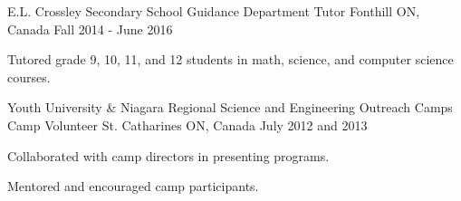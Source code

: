 
\begin{cventries}

\cventry
    {E.L. Crossley Secondary School Guidance Department}
    {Tutor}
    {Fonthill ON, Canada}
    {Fall 2014 - June 2016}
    {
      \begin{cvitems}
        \item Tutored grade 9, 10, 11, and 12 students in math, science, and computer science courses.
      \end{cvitems}
    }

\cventry
    {Youth University \& Niagara Regional Science and Engineering Outreach Camps}
    {Camp Volunteer}
    {St. Catharines ON, Canada}
    {July 2012 and 2013}
    {
      \begin{cvitems}
        \item Collaborated with camp directors in presenting programs.
        \item Mentored and encouraged camp participants.
      \end{cvitems}
    }

\end{cventries}
